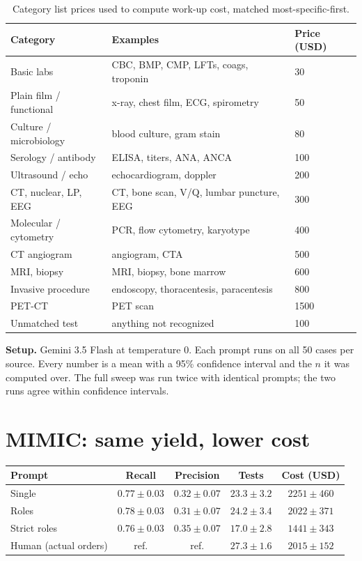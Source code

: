 \documentclass[11pt]{article}
\begin{document}
\begin{table}[h]
\centering\small
\begin{tabular}{lll}
\toprule
Category & Examples & Price (USD) \\
\midrule
Basic labs & CBC, BMP, CMP, LFTs, coags, troponin & 30 \\
Plain film / functional & x-ray, chest film, ECG, spirometry & 50 \\
Culture / microbiology & blood culture, gram stain & 80 \\
Serology / antibody & ELISA, titers, ANA, ANCA & 100 \\
Ultrasound / echo & echocardiogram, doppler & 200 \\
CT, nuclear, LP, EEG & CT, bone scan, V/Q, lumbar puncture, EEG & 300 \\
Molecular / cytometry & PCR, flow cytometry, karyotype & 400 \\
CT angiogram & angiogram, CTA & 500 \\
MRI, biopsy & MRI, biopsy, bone marrow & 600 \\
Invasive procedure & endoscopy, thoracentesis, paracentesis & 800 \\
PET-CT & PET scan & 1500 \\
Unmatched test & anything not recognized & 100 \\
\bottomrule
\end{tabular}
\caption{Category list prices used to compute work-up cost, matched most-specific-first.}
\label{tab:cost}
\end{table}

\textbf{Setup.} Gemini 3.5 Flash at temperature 0. Each prompt runs on all 50 cases per source. Every number is a mean with a 95\% confidence interval and the $n$ it was computed over. The full sweep was run twice with identical prompts; the two runs agree within confidence intervals.

\section{MIMIC: same yield, lower cost}

\begin{table}[h]
\centering\small
\begin{tabular}{lcccc}
\toprule
Prompt & Recall & Precision & Tests & Cost (USD) \\
\midrule
Single & $0.77 \pm 0.03$ & $0.32 \pm 0.07$ & $23.3 \pm 3.2$ & $2251 \pm 460$ \\
Roles & $0.78 \pm 0.03$ & $0.31 \pm 0.07$ & $24.2 \pm 3.4$ & $2022 \pm 371$ \\
Strict roles & $0.76 \pm 0.03$ & $0.35 \pm 0.07$ & $17.0 \pm 2.8$ & $1441 \pm 343$ \\
Human (actual orders) & ref. & ref. & $27.3 \pm 1.6$ & $2015 \pm 152$ \\
\bottomrule
\end{tabular}
\label{tab:mimic}
\end{table}
\end{document}
